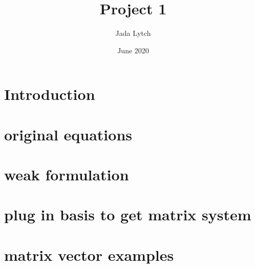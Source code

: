 \documentclass{article}
\title{Project 1}
\author{Jada Lytch }
\date{June 2020}
\begin{document}
\maketitle

\section{Introduction}

\section{original equations}

\section{weak formulation}

\section{plug in basis to get matrix system}

\section{matrix vector examples}
\end{document}
